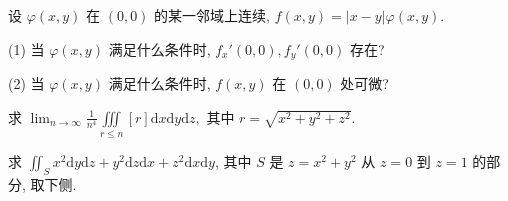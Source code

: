 设 $\varphi(x, y)$ 在 $(0, 0)$ 的某一邻域上连续, $f(x, y) = |x - y| \varphi(x, y)$.\par
(1) 当 $\varphi(x, y)$ 满足什么条件时, $f_x'(0, 0), f_y'(0, 0)$ 存在?\par
(2) 当 $\varphi(x, y)$ 满足什么条件时, $f(x, y)$ 在 $(0, 0)$ 处可微?\par
\par{}
求 $\lim_{n\to \infty}\frac{1}{n^4}\iiint \limits_{r\leq n}[r]\mathrm{d}x\mathrm{d}y\mathrm{d}z,$ 其中 $r = \sqrt{x^2 + y^2 + z^2}$.\par
\par{}
求 $\iint_{S} x^{2} \mathrm{d}y \mathrm{d}z + y^{2} \mathrm{d}z \mathrm{d}x + z^{2} \mathrm{d}x \mathrm{d}y$, 其中 $S$ 是 $z = x^{2} + y^{2}$ 从 $z = 0$ 到 $z = 1$ 的部分, 取下侧.\par
